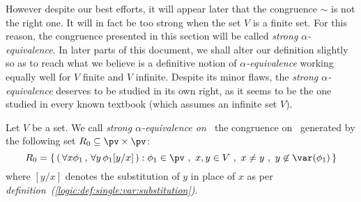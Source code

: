However despite our
best efforts, it will appear later that  the congruence $\sim$ is
not the right one. It will in fact be too strong when the set $V$ is
a finite set. For this reason, the congruence presented in this
section will be called {\em strong $\alpha$-equivalence}. In
later parts of this document, we shall alter our definition slightly
so as to reach what we believe is a definitive notion of {\em
$\alpha$-equivalence} working equally well for $V$ finite and $V$
infinite. Despite its minor flaws, the {\em strong $\alpha$-equivalence} 
deserves to be studied in its own right, as it seems to
be the one studied in every known textbook (which assumes an
infinite set $V$).

\begin{defin}\label{logic:def:strong:sub:congruence}
Let $V$ be a set. We call {\em strong $\alpha$-equivalence on
\pv\ }the congruence on \pv\ generated by the following set
$R_{0}\subseteq \pv\times\pv$:
    \[
    R_{0}=\left\{\,(\,\forall x\phi_{1}\,,\,\forall
    y\,\phi_{1}[y/x]\,):\phi_{1}\in\pv\ ,\ x,y\in V\ ,\ x\neq y\ ,\
    y\not\in\var(\phi_{1})\,\right\}
    \]
where $[y/x]$ denotes the substitution of $y$ in place of $x$ as per
{\em definition~(\ref{logic:def:single:var:substitution})}.
\end{defin}

